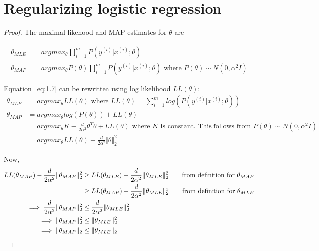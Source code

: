 \documentclass{article}
\begin{document}
\section{Regularizing logistic regression}
\begin{proof}
The maximal likehood and MAP estimates for $\theta$ are

\newcommand{\thetaMAP}{\theta_{MAP}}
\newcommand{\thetaMLE}{\theta_{MLE}}

\begin{equation}
  \label{eq:1.7}
  \begin{split}
  \thetaMLE &= argmax_{\theta}\prod_{i=1}^m P(y^{(i)} | x^{(i)} ; \theta) \\
  \thetaMAP &= argmax_{\theta}P(\theta)\prod_{i=1}^m P(y^{(i)} | x^{(i)} ; \theta) \text{ where } P(\theta) \sim N(0,\alpha^2I)
  \end{split}
\end{equation}

Equation~\ref{eq:1.7} can be rewritten using log likelihood $LL(\theta)$:
\begin{equation}
  \label{eq:1.8}
  \begin{split}
  \thetaMLE &= argmax_{\theta}LL(\theta) \text{ where } LL(\theta) = \sum_{i=1}^m log(P(y^{(i)} | x^{(i)} ; \theta)) \\
  \thetaMAP &= argmax_{\theta} log(P(\theta)) + LL(\theta) \\
            &= argmax_{\theta} K - \frac{d}{2\alpha^2}\theta^T\theta + LL(\theta) \text{ where $K$ is constant. This follows from $P(\theta) \sim N(0,\alpha^2I)$}\\
            &= argmax_{\theta}  LL(\theta) - \frac{d}{2\alpha^2}\Vert \theta \Vert_2^2
  \end{split}
\end{equation}


Now,
\begin{equation}
  \label{eq:1.9}
  \begin{split}
   LL(\thetaMAP) - \frac{d}{2\alpha^2}\Vert \thetaMAP \Vert_2^2 &\geq    LL(\thetaMLE) - \frac{d}{2\alpha^2}\Vert \thetaMLE \Vert_2^2 \text{\qquad from definition for $\thetaMAP$} \\
                                                                &\geq    LL(\thetaMAP) - \frac{d}{2\alpha^2}\Vert \thetaMLE \Vert_2^2 \text{\qquad from definition for $\thetaMLE$} \\
   \implies \frac{d}{2\alpha^2}\Vert \thetaMAP \Vert_2^2 &\leq \frac{d}{2\alpha^2}\Vert \thetaMLE \Vert_2^2 \\
   \implies \Vert \thetaMAP \Vert_2^2 &\leq \Vert \thetaMLE \Vert_2^2 \\
   \implies \Vert \thetaMAP \Vert_2 &\leq \Vert \thetaMLE \Vert_2 
  \end{split}
\end{equation}
\end{proof}
\end{document}

